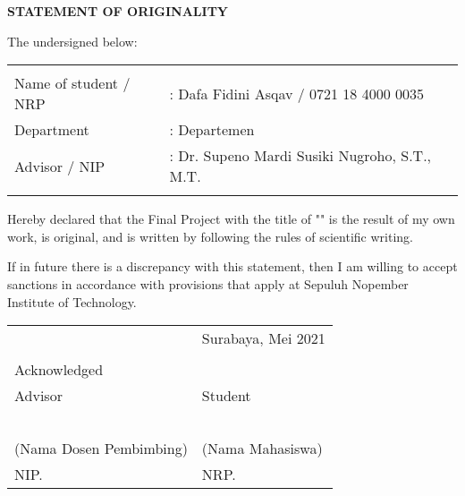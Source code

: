 \begin{center}
  \large
  \textbf{STATEMENT OF ORIGINALITY}
\end{center}

\thispagestyle{empty}

\vspace{2ex}


\noindent The undersigned below:

\noindent\begin{tabularx}{\textwidth}{X X l}
  & \\
  Name of student / NRP &: Dafa Fidini Asqav / 0721 18 4000 0035 \\
  Department &: Departemen \\
  Advisor / NIP &: Dr. Supeno Mardi Susiki Nugroho, S.T., M.T.  \\
  & \\
\end{tabularx}

Hereby declared that the Final Project with the title of "" is the result of my own work, is original, and is written by following the rules of scientific writing.

If in future there is a discrepancy with this statement, then I am willing to accept sanctions in accordance with provisions that apply at Sepuluh Nopember Institute of Technology.

\vspace{8ex}

\noindent\begin{tabularx}{\textwidth}{X l}
  & Surabaya, Mei 2021\\
  & \\
  Acknowledged & \\
  Advisor & Student\\
  & \\
  & \\
  & \\
  & \\
  & \\
  (Nama Dosen Pembimbing) & (Nama Mahasiswa) \\
  NIP. & NRP. \\
\end{tabularx}